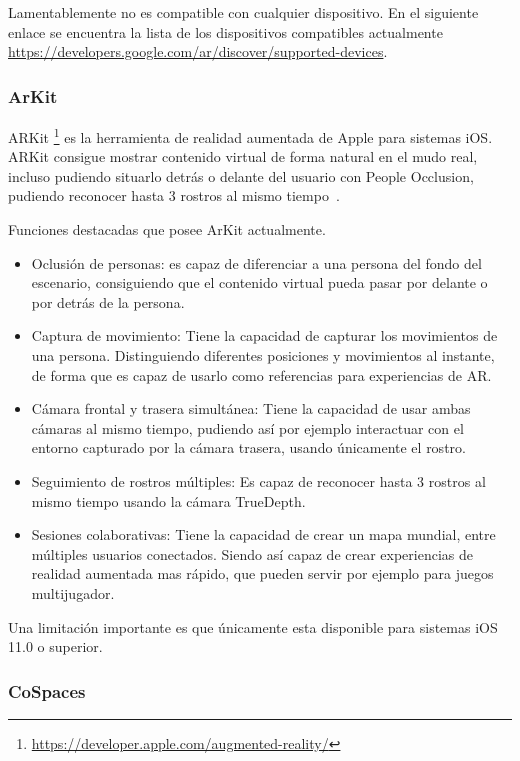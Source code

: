 Lamentablemente no es compatible con cualquier dispositivo. En el siguiente enlace se encuentra la lista de los dispositivos compatibles actualmente \url{https://developers.google.com/ar/discover/supported-devices}.

\subsubsection{ArKit}

ARKit \footnote{\url{https://developer.apple.com/augmented-reality/}} es la herramienta de realidad aumentada de Apple para sistemas iOS. ARKit consigue mostrar contenido virtual de forma natural en el mudo real, incluso pudiendo situarlo detrás o delante del usuario con People Occlusion, pudiendo reconocer hasta 3 rostros al mismo tiempo~\cite{apple_inc}.

Funciones destacadas que posee ArKit actualmente.

\begin{itemize}
	\item Oclusión de personas: es capaz de diferenciar a una persona del fondo del escenario, consiguiendo que el contenido virtual  pueda pasar por delante o por detrás de la persona.
	\item Captura de movimiento: Tiene la capacidad de capturar los movimientos de una persona. Distinguiendo diferentes posiciones y movimientos al instante, de forma que es capaz de usarlo como referencias para experiencias de AR.
	\item Cámara frontal y trasera simultánea: Tiene la capacidad de usar ambas cámaras al mismo tiempo, pudiendo así por ejemplo interactuar con el entorno capturado por la cámara trasera, usando únicamente el rostro.
	\item Seguimiento de rostros múltiples: Es capaz de reconocer hasta 3 rostros al mismo tiempo usando la cámara TrueDepth.
	\item Sesiones colaborativas: Tiene la capacidad de crear un mapa mundial, entre múltiples usuarios conectados. Siendo así capaz de crear experiencias de realidad aumentada mas rápido, que pueden servir por ejemplo para juegos multijugador.
\end{itemize}



Una limitación importante es que únicamente esta disponible para sistemas iOS 11.0 o superior.


\subsubsection{CoSpaces}\label{sub:Def_cospace} 


